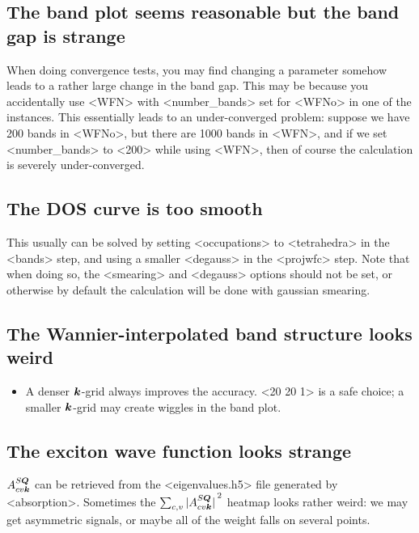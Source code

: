 \documentclass[hyperref, a4paper, 12pt]{report}
\def\texttt#1{<#1>}%
\newcommand{\shortcode}[1]{\texttt{#1}}
\begin{document}
\subsection{The band plot seems reasonable but the band gap is strange}

When doing convergence tests, 
you may find changing a parameter 
somehow leads to a rather large change in the band gap. 
This may be because you accidentally use \shortcode{WFN} 
with \shortcode{number_bands} set for \shortcode{WFNo} 
in one of the instances. 
This essentially leads to an under-converged problem: 
suppose we have 200 bands in \shortcode{WFNo},
but there are 1000 bands in \shortcode{WFN}, 
and if we set \shortcode{number_bands} to \shortcode{200} 
while using \shortcode{WFN}, 
then of course the calculation is severely under-converged.

\subsection{The DOS curve is too smooth}

This usually can be solved by 
setting \shortcode{occupations} to \shortcode{tetrahedra}
in the \shortcode{bands} step,
and using a smaller \shortcode{degauss} in the \shortcode{projwfc} step.
Note that when doing so, 
the \shortcode{smearing} and \shortcode{degauss} options 
should not be set, 
or otherwise by default the calculation will be done with gaussian smearing.

\subsection{The Wannier-interpolated band structure looks weird}

\begin{itemize}
    \item A denser $\vb*{k}$-grid always improves the accuracy. 
        \shortcode{20 20 1} is a safe choice; 
        a smaller $\vb*{k}$-grid may create wiggles in the band plot. 
\end{itemize}

\subsection{The exciton wave function looks strange} 

$A^{S\vb*{Q}}_{cv \vb*{k}}$ can be retrieved from 
the \shortcode{eigenvalues.h5} file generated by \shortcode{absorption}.
Sometimes the $\sum_{c, v} \abs*{A^{S \vb*{Q}}_{cv \vb*{k}}}^2$ 
heatmap looks rather weird: 
we may get asymmetric signals, 
or maybe all of the weight falls on several points. 
\end{document}
